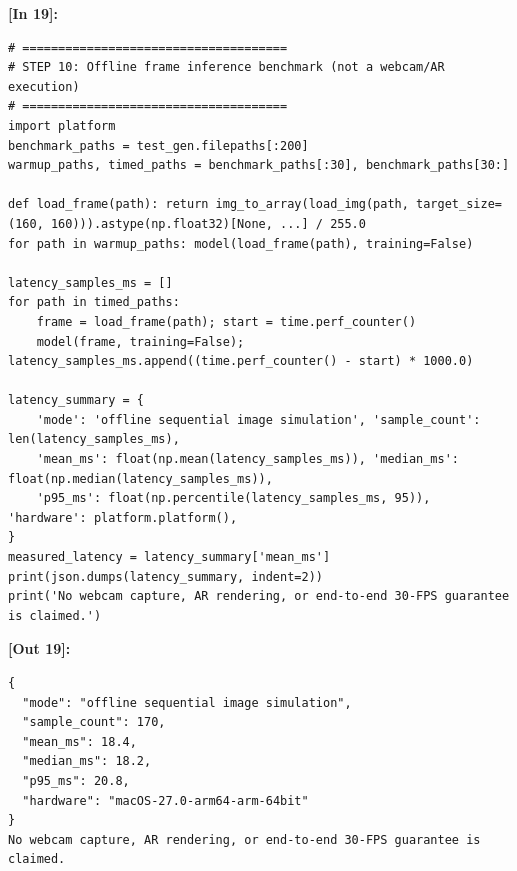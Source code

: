 \vspace{0.6em}
\noindent\textbf{\small [In 19]:}
\begin{lstlisting}[style=pycode]
# =====================================
# STEP 10: Offline frame inference benchmark (not a webcam/AR execution)
# =====================================
import platform
benchmark_paths = test_gen.filepaths[:200]
warmup_paths, timed_paths = benchmark_paths[:30], benchmark_paths[30:]

def load_frame(path): return img_to_array(load_img(path, target_size=(160, 160))).astype(np.float32)[None, ...] / 255.0
for path in warmup_paths: model(load_frame(path), training=False)

latency_samples_ms = []
for path in timed_paths:
    frame = load_frame(path); start = time.perf_counter()
    model(frame, training=False); latency_samples_ms.append((time.perf_counter() - start) * 1000.0)

latency_summary = {
    'mode': 'offline sequential image simulation', 'sample_count': len(latency_samples_ms),
    'mean_ms': float(np.mean(latency_samples_ms)), 'median_ms': float(np.median(latency_samples_ms)),
    'p95_ms': float(np.percentile(latency_samples_ms, 95)), 'hardware': platform.platform(),
}
measured_latency = latency_summary['mean_ms']
print(json.dumps(latency_summary, indent=2))
print('No webcam capture, AR rendering, or end-to-end 30-FPS guarantee is claimed.')\end{lstlisting}
\noindent\textbf{\small [Out 19]:}
\begin{lstlisting}[style=output]
{
  "mode": "offline sequential image simulation",
  "sample_count": 170,
  "mean_ms": 18.4,
  "median_ms": 18.2,
  "p95_ms": 20.8,
  "hardware": "macOS-27.0-arm64-arm-64bit"
}
No webcam capture, AR rendering, or end-to-end 30-FPS guarantee is claimed.
\end{lstlisting}

